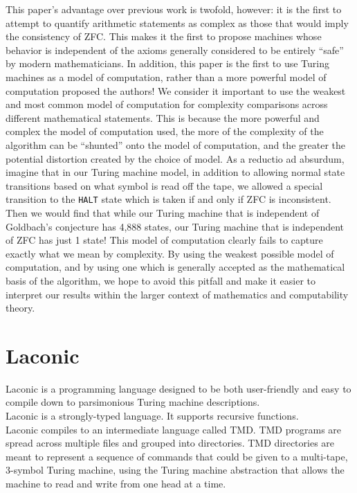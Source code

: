 \documentclass[11pt]{article}
\newcommand{\gbstatenum}{4,888 }
\begin{document}
This paper's advantage over previous work is twofold, however: it is the first to attempt to quantify arithmetic statements as complex as those that would imply the consistency of ZFC. This makes it the first to propose machines whose behavior is independent of the axioms generally considered to be entirely ``safe'' by modern mathematicians. In addition, this paper is the first to use Turing machines as a model of computation, rather than a more powerful model of computation proposed the authors! We consider it important to use the weakest and most common model of computation for complexity comparisons across different mathematical statements. This is because the more powerful and complex the model of computation used, the more of the complexity of the algorithm can be ``shunted'' onto the model of computation, and the greater the potential distortion created by the choice of model. As a reductio ad absurdum, imagine that in our Turing machine model, in addition to allowing normal state transitions based on what symbol is read off the tape, we allowed a special transition to the \texttt{HALT} state which is taken if and only if ZFC is inconsistent. Then we would find that while our Turing machine that is independent of Goldbach's conjecture has \gbstatenum states, our Turing machine that is independent of ZFC has just 1 state! This model of computation clearly fails to capture exactly what we mean by complexity. By using the weakest possible model of computation, and by using one which is generally accepted as the mathematical basis of the algorithm, we hope to avoid this pitfall and make it easier to interpret our results within the larger context of mathematics and computability theory.

\section{Laconic}

Laconic is a programming language designed to be both user-friendly and easy to compile down to parsimonious Turing machine descriptions. \\

Laconic is a strongly-typed language. It supports recursive functions. \\

Laconic compiles to an intermediate language called TMD. TMD programs are spread across multiple files and grouped into directories. TMD directories are meant to represent a sequence of commands that could be given to a multi-tape, 3-symbol Turing machine, using the Turing machine abstraction that allows the machine to read and write from one head at a time. \\
\end{document}
